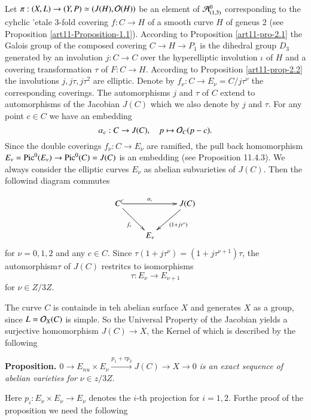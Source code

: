 Let $\pi : (X, L) \rightarrow (Y, P) \simeq (J(H), \mathcal{O}(H))$ be an element of $\mathcal{A}_{(1,3)}^{0}$ corresponding to the cyhclic 'etale 3-fold covering $f : C\rightarrow H$ of a smooth curve $H$ of geneus 2
(see Proposition \ref{art11-Proposition-1.1}). According  to Proposition \ref{art11-pro-2.1} the Galois group of the composed covering $C\rightarrow H \rightarrow P_{1}$ is the dihedral group $D_{3}$ generated by an involution $j : C\rightarrow C$ over the hyperelliptic involution $\iota$ of $H$ and a covering transformation $\tau$ of $F :C \rightarrow H$. According to Proposition \ref{art11-prop-2.2} the involutions $j, j\tau, j\tau^{2}$ are elliptic. Denote by $f_{\nu} : C\rightarrow E_{\nu} = C/j\tau^{\nu}$ the corresponding coverings. The automorphisms $j$ and $\tau$ of $C$ extend to automorphisms of the Jacobian $J(C)$ which we also denote by $j$ and $\tau$. For any point $c \in C$ we have an embedding
$$
\alpha_{c}: C\rightarrow J(C),\quad p \mapsto \mathcal{O}_{C}(p-c).
$$
Since the double coverings $f_{\nu}: C \rightarrow E_{\nu}$ are ramified, the pull back homomorphism $E_{\nu} = \operatorname{Pic}^{0}(E_{\nu}) \rightarrow \operatorname{Pic}^{0}(C)=J(C)$ is an embedding (see \cite{art11-keyL-B} Proposition 11.4.3). We always
consider the elliptic curves $E_{\nu}$ as abelian subvarieties of $J(C)$. Then the followind diagram commutes

\setcounter{equation}{0}
\begin{equation}\label{art11-sec-eq-1}
\vcenter{
\xymatrix{
C  \ar@{^{(}->}[rr]^-{\alpha_{c}}\ar[dr]_{f_{\nu}} &  &J(C)\ar[dl]^-{(1+j\tau^{\nu})} \\
   & E_{\nu}  &
}}
\end{equation}
for $\nu =0,1,2$ and any $c \in C$. Since $\tau(1+j\tau^{\nu})=(1 + j\tau^{\nu+1})\tau$, the automorphism$\tau$ of $J(C)$ restritcs to isomorphisms
$$
\tau : E_{\nu} \rightarrow E_{\nu+1}
$$
for $\nu \in Z /3Z$.

 The curve $C$ is containde in teh abelian surface $X$ and generates $X$ as a group, since $L =\mathcal{O}_{X}(C)$ is simple. So the Universal Property of the Jacobian yields a surjective homomorphism $J(C)\rightarrow X$, the Kernel of which is described by the following

\medskip
\noindent
{\bfseries {} Proposition. \label{art11-prop-5.1}}
$0\rightarrow  E_{nu} \times E_{\nu} \xrightarrow {p_{1}+\tau p_{2}}J(C) \rightarrow X \rightarrow 0$ \textit{is an exact sequence of abelian varieties for} $\nu \in z /3Z$. 

 Here $p_{i}: E_{\nu} \times E_{\nu} \rightarrow E_{\nu}$ denotes the $i$-th projection for $i=1,2$. Forthe proof of the proposition we need the following

